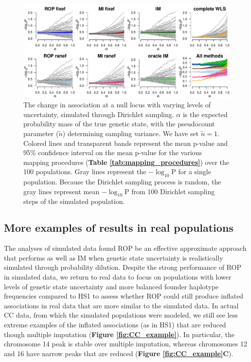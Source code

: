 \begin{figure}
\centering
\renewcommand{\familydefault}{\sfdefault}\normalfont
\includegraphics[width=\textwidth]{figures/4-mi/CC_pvalue_fluct_null_mean_count1.pdf}
\caption[Effect of uncertainty modeled through Dirichlet sampling on association at null locus in simulated data]{The change in association at a null locus with varying levels of uncertainty, simulated through Dirichlet sampling. $\alpha$ is the expected probability mass of the true genetic state, with the pseudocount parameter ($\tilde{n}$) determining sampling variance. We have set $\tilde{n} = 1$.  Colored lines and transparent bands represent the mean p-value and 95\% confidence interval on the mean p-value for the various mapping procedures (\textbf{Table \ref{tab:mapping_procedures}}) over the 100 populations. Gray lines represent the $-\log_{10}\text{P}$ for a single population. Because the Dirichlet sampling process is random, the gray lines represent mean $-\log_{10}\text{P}$ from 100 Dirichlet sampling steps of the simulated population.\label{fig:multi_pval_count1_null}}
\end{figure}

\subsection{More examples of results in real populations}

The analyses of simulated data found ROP be an effective approximate approach that performs as well as IM when genetic state uncertainty is realistically simulated through probability dilution. Despite the strong performance of ROP in simulated data, we return to real data to focus on populations with lower levels of genetic state uncertainty and more balanced founder haplotype frequencies compared to HS1 to assess whether ROP could still produce inflated associations in real data that are more similar to the simulated data. In actual CC data, from which the simulated populations were modeled, we still see less extreme examples of the inflated associations (as in HS1) that are reduced though multiple imputation (\textbf{Figure \ref{fig:CC_example}}). In particular, the chromosome 14 peak is stable over multiple imputation, whereas chromosomes 12 and 16 have narrow peaks that are reduced (\textbf{Figure \ref{fig:CC_example}C}). 

